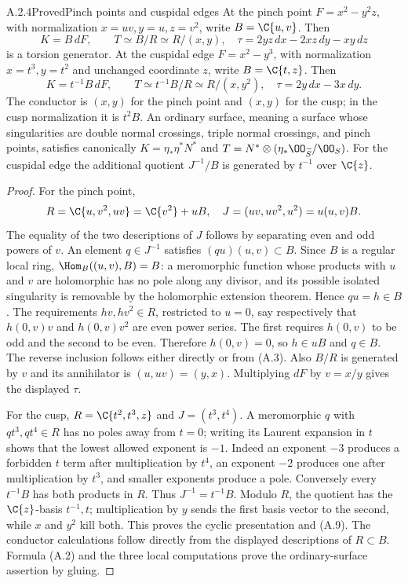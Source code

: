 \begin{statement}{A.2.4}{Proved}{Pinch points and cuspidal edges}
At the pinch point $F=x^2-y^2z$, with normalization $x=uv,y=u,z=v^2$, write $B=\C\{u,v\}$. Then
\[
 K=B\,dF,\qquad T\simeq B/R\simeq R/(x,y),
\quad \tau=2yz\,dx-2xz\,dy-xy\,dz
\tag{A.8}
\]
is a torsion generator. At the cuspidal edge $F=x^2-y^3$, with normalization $x=t^3,y=t^2$ and unchanged coordinate $z$, write $B=\C\{t,z\}$. Then
\[
 K=t^{-1}B\,dF,\qquad
 T\simeq t^{-1}B/R\simeq R/(x,y^2),
 \quad\tau=2y\,dx-3x\,dy.
\tag{A.9}
\]
The conductor is $(x,y)$ for the pinch point and $(x,y)$ for the cusp; in the cusp normalization it is $t^2B$. An ordinary surface, meaning a surface whose singularities are double normal crossings, triple normal crossings, and pinch points, satisfies canonically $K=\eta_*\eta^*N^*$ and $T=N^*\otimes(\eta_*\OO_{\widetilde S}/\OO_S)$. For the cuspidal edge the additional quotient $J^{-1}/B$ is generated by $t^{-1}$ over $\C\{z\}$.
\end{statement}
\begin{proof}
For the pinch point,
\[
 R=\C\{u,v^2,uv\}=\C\{v^2\}+uB,
 \quad J=(uv,uv^2,u^2)=u(u,v)B.
\]
The equality of the two descriptions of $J$ follows by separating even and odd powers of $v$. An element $q\in J^{-1}$ satisfies $(qu)(u,v)\subset B$. Since $B$ is a regular local ring, $\Hom_B((u,v),B)=B$: a meromorphic function whose products with $u$ and $v$ are holomorphic has no pole along any divisor, and its possible isolated singularity is removable by the holomorphic extension theorem. Hence $qu=h\in B$. The requirements $hv,hv^2\in R$, restricted to $u=0$, say respectively that $h(0,v)v$ and $h(0,v)v^2$ are even power series. The first requires $h(0,v)$ to be odd and the second to be even. Therefore $h(0,v)=0$, so $h\in uB$ and $q\in B$. The reverse inclusion follows either directly or from (A.3). Also $B/R$ is generated by $v$ and its annihilator is $(u,uv)=(y,x)$. Multiplying $dF$ by $v=x/y$ gives the displayed $\tau$.

For the cusp, $R=\C\{t^2,t^3,z\}$ and $J=(t^3,t^4)$. A meromorphic $q$ with $qt^3,qt^4\in R$ has no poles away from $t=0$; writing its Laurent expansion in $t$ shows that the lowest allowed exponent is $-1$. Indeed an exponent $-3$ produces a forbidden $t$ term after multiplication by $t^4$, an exponent $-2$ produces one after multiplication by $t^3$, and smaller exponents produce a pole. Conversely every $t^{-1}B$ has both products in $R$. Thus $J^{-1}=t^{-1}B$. Modulo $R$, the quotient has the $\C\{z\}$-basis $t^{-1},t$; multiplication by $y$ sends the first basis vector to the second, while $x$ and $y^2$ kill both. This proves the cyclic presentation and (A.9). The conductor calculations follow directly from the displayed descriptions of $R\subset B$. Formula (A.2) and the three local computations prove the ordinary-surface assertion by gluing.
\end{proof}

